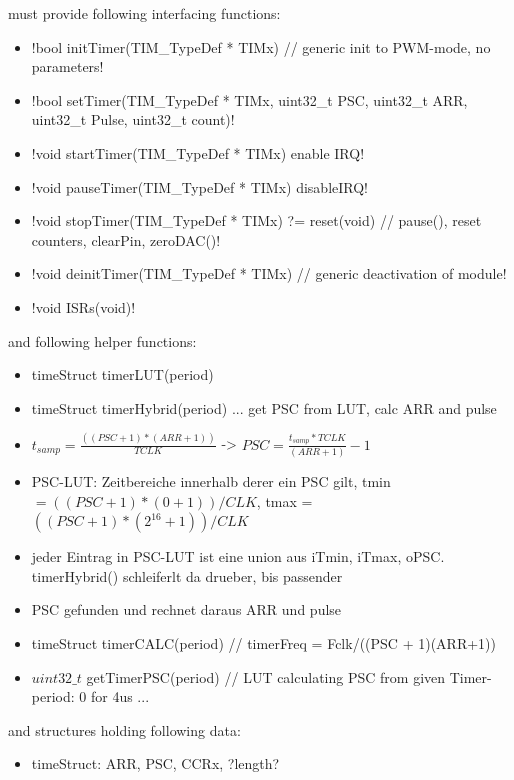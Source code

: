 	{	must provide following interfacing functions:
		\begin{itemize} \setlength\itemsep{1px}
			\item \lstC !bool initTimer(TIM_TypeDef * TIMx) // generic init to PWM-mode, no parameters!
			\item \lstC !bool setTimer(TIM_TypeDef * TIMx, uint32_t PSC, uint32_t ARR, uint32_t Pulse, uint32_t count)!
			\item \lstC !void startTimer(TIM_TypeDef * TIMx) enable IRQ!
			\item \lstC !void pauseTimer(TIM_TypeDef * TIMx) disableIRQ!
			\item \lstC !void stopTimer(TIM_TypeDef * TIMx) ?= reset(void) // pause(), reset counters, clearPin, zeroDAC()!
			\item \lstC !void deinitTimer(TIM_TypeDef * TIMx)	// generic deactivation of module!
			\item \lstC !void ISRs(void)!
		\end{itemize}
		and following helper functions:
		\begin{itemize} \setlength\itemsep{1px}
			\item timeStruct timerLUT(period)
			\item timeStruct timerHybrid(period) ... get PSC from LUT, calc ARR and pulse 
			\item $t_{samp}  = \frac{((PSC + 1)*(ARR+1))}{TCLK}$ -> $PSC = \frac{t_{samp} * TCLK }{(ARR+1)} - 1$
			\item 	PSC-LUT: Zeitbereiche innerhalb derer ein PSC gilt, tmin $ = ((PSC + 1)*(0+1))/CLK$, tmax = $((PSC + 1)*(2^16+1))/CLK$ 
				\item 	jeder Eintrag in PSC-LUT ist eine union aus iTmin, iTmax, oPSC. timerHybrid() schleiferlt da drueber, bis passender \item 	PSC gefunden und rechnet daraus ARR und pulse
			\item timeStruct timerCALC(period) // timerFreq = Fclk/((PSC + 1)(ARR+1))
			\item $uint32\_t$ getTimerPSC(period) // LUT calculating PSC from given Timer-period: 0 for 4us ... 
		\end{itemize}

		and structures holding following data:
		\begin{itemize} \setlength\itemsep{1px}
		\item 	timeStruct: 	ARR, PSC, CCRx, ?length?
		\end{itemize}
	}

